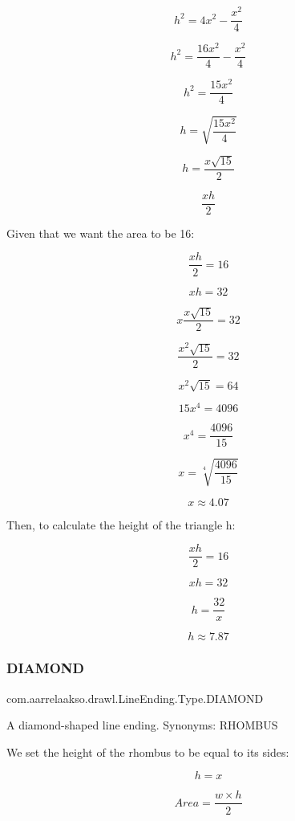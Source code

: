 \[h^2 = 4x^2 - \frac{x^2}{4}\]

\[h^2 = \frac{16x^2}{4} - \frac{x^2}{4}\]

\[h^2 = \frac{15x^2}{4}\]

\[h = \sqrt{\frac{15x^2}{4}}\]

\[h = \frac{x \sqrt{15}}{2}\]

\[\frac{xh}{2}\]

Given that we want the area to be 16\+:

\[ \frac{xh}{2} = 16\]

\[xh = 32\]

\[x \frac{x \sqrt{15}}{2} = 32\]

\[\frac{x^2 \sqrt{15}}{2} = 32\]

\[ x^2 \sqrt{15} = 64\]

\[15 x^4 = 4096\]

\[x^4 = \frac{4096}{15}\]

\[x = \sqrt[4]{\frac{4096}{15}}\]

\[x \approx 4.07\]

Then, to calculate the height of the triangle h\+:

\[\frac{xh}{2} = 16\]

\[xh = 32\]

\[h = \frac{32}{x}\]

\[h \approx 7.87\] \mbox{\label{enumcom_1_1aarrelaakso_1_1drawl_1_1_line_ending_1_1_type_aa3ce0f93b6befa8383c516df010aeed4}} 
\subsubsection{\texorpdfstring{D\+I\+A\+M\+O\+ND}{DIAMOND}}
{\footnotesize\ttfamily com.\+aarrelaakso.\+drawl.\+Line\+Ending.\+Type.\+D\+I\+A\+M\+O\+ND}

A diamond-\/shaped line ending. Synonyms\+: R\+H\+O\+M\+B\+US



We set the height of the rhombus to be equal to its sides\+:

\[h = x\]

\[Area = \frac{w \times h}{2}\]

